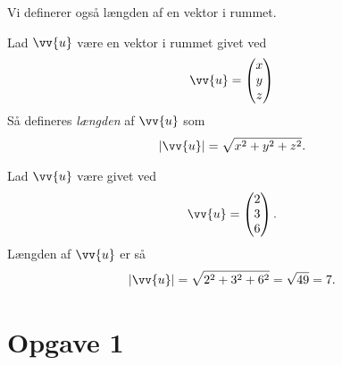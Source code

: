 Vi definerer også længden af en vektor i rummet.
\begin{defn}
	Lad $\vv{u}$ være en vektor i rummet givet ved
	\begin{align*}
		\vv{u} = 
		\begin{pmatrix}
			x \\ y \\ z
		\end{pmatrix}
	\end{align*}
	Så defineres \textit{længden} af $\vv{u}$ som 
	\begin{align*}
		|\vv{u}| = \sqrt{x^2+y^2+z^2}.
	\end{align*}
\end{defn}
\begin{exa}
	Lad $\vv{u}$ være givet ved
	\begin{align*}
		\vv{u} = 
		\begin{pmatrix}
			2 \\ 3 \\ 6
		\end{pmatrix}.
	\end{align*}
	Længden af $\vv{u}$ er så
	\begin{align*}
		|\vv{u}| = \sqrt{2^2+3^2+6^2} = \sqrt{49} =7. 
	\end{align*}
\end{exa}

\section*{Opgave 1}

